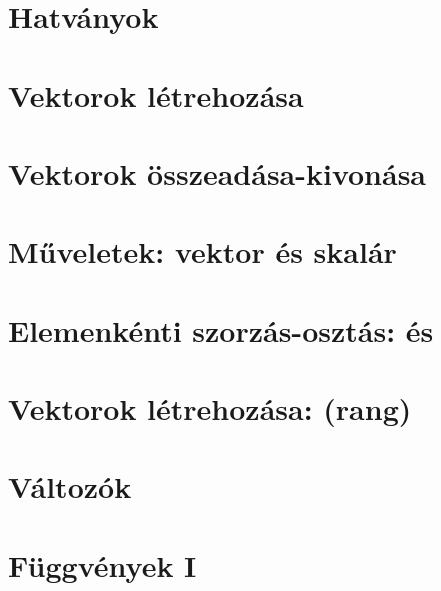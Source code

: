 \begin{spacing}{1.2}
\section*{Hatványok} \label{DBmatlabia5Mo}
\Mo{

}
\vspace{0.5cm}
\newpage
\section*{Vektorok létrehozása} \label{DBmatlabia6}
\Desc{

}
\vspace{0.5cm}
\newpage
\section*{Vektorok összeadása-kivonása} \label{DBmatlabia6s}
\Desc{

}
\vspace{0.5cm}
\newpage
\section*{Műveletek: vektor és skalár} \label{DBmatlabia7}
\Desc{

}
\vspace{0.5cm}
\newpage
\section*{Elemenkénti szorzás-osztás:  és } \label{DBmatlabia8}
\Desc{

}
\vspace{0.5cm}
\newpage
\section*{Vektorok létrehozása: \mcode{:} (rang)} \label{DBmatlabia9}
\Desc{

}
\vspace{0.5cm}
\newpage
\section*{Változók} \label{DBmatlabia10}
\Desc{

}
\vspace{0.5cm}
\newpage
\section*{Függvények I} \label{DBmatlabia11}
\Desc{

}
\vspace{0.5cm}
\newpage

\end{spacing}
